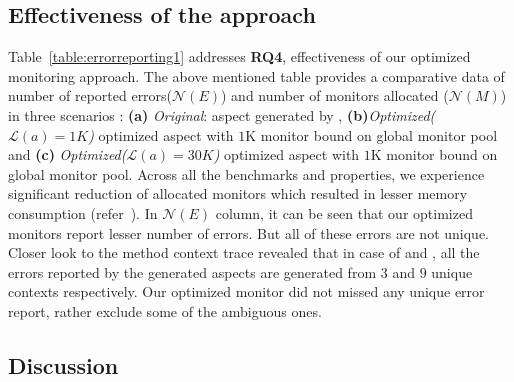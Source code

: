 \subsection{Effectiveness of the approach}
\label{sec:evaluation:effectiveness}

Table~\ref{table:errorreporting1} addresses \textbf{RQ4}, \ie effectiveness of
our optimized monitoring approach. The above mentioned table provides a
comparative data of number of reported errors($\mathcal{N}(E)$) and number of
monitors allocated ($\mathcal{N}(M)$) in three scenarios : \textbf{(a)}
\emph{Original}: aspect generated by \javamop,
\textbf{(b)}\emph{Optimized($\mathcal{L}(a) = 1K$)} optimized aspect with $1$K
monitor bound on global monitor pool and \textbf{(c)}
\emph{Optimized($\mathcal{L}(a) = 30K$)} optimized aspect with $1$K monitor
bound on global monitor pool. Across all the benchmarks and properties, we
experience significant reduction of allocated monitors which resulted in lesser
memory consumption (refer~). In $\mathcal{N}(E)$
column, it can be seen that our optimized monitors report lesser number of
errors. But all of these errors are not unique. Closer look to the method
context trace revealed that in case of \bloat and \avrora, all the errors
reported by the \javamop generated aspects are generated from $3$ and $9$ unique
contexts respectively. Our optimized monitor did not missed any unique error
report, rather exclude some of the ambiguous ones.

\subsection{Discussion}
\label{sec:discussion}



